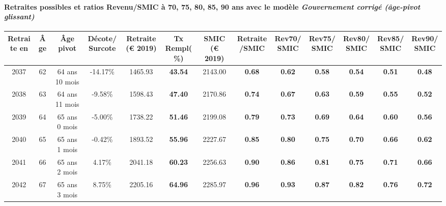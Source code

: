 \paragraph{Retraites possibles et ratios Revenu/SMIC à 70, 75, 80, 85, 90 ans avec le modèle \emph{Gouvernement corrigé (âge-pivot glissant)}}  
 
{ \scriptsize \begin{center} 
\begin{tabular}[htb]{|c|c||c|c||c|c||c||c|c|c|c|c|c|} 
\hline 
 Retraite en &  Âge &  Âge pivot &  Décote/Surcote &  Retraite (\euro{} 2019) &  Tx Rempl(\%) &  SMIC (\euro{} 2019) &  Retraite/SMIC &  Rev70/SMIC &  Rev75/SMIC &  Rev80/SMIC &  Rev85/SMIC &  Rev90/SMIC \\ 
\hline \hline 
 2037 &  62 &  64 ans 10 mois &  -14.17\% &  1465.93 &  {\bf 43.54} &  2143.00 &  {\bf {\color{red} 0.68}} &  {\bf {\color{red} 0.62}} &  {\bf {\color{red} 0.58}} &  {\bf {\color{red} 0.54}} &  {\bf {\color{red} 0.51}} &  {\bf {\color{red} 0.48}} \\ 
\hline 
 2038 &  63 &  64 ans 11 mois &  -9.58\% &  1598.43 &  {\bf 47.40} &  2170.86 &  {\bf {\color{red} 0.74}} &  {\bf {\color{red} 0.67}} &  {\bf {\color{red} 0.63}} &  {\bf {\color{red} 0.59}} &  {\bf {\color{red} 0.55}} &  {\bf {\color{red} 0.52}} \\ 
\hline 
 2039 &  64 &  65 ans 0 mois &  -5.00\% &  1738.22 &  {\bf 51.46} &  2199.08 &  {\bf {\color{red} 0.79}} &  {\bf {\color{red} 0.73}} &  {\bf {\color{red} 0.69}} &  {\bf {\color{red} 0.64}} &  {\bf {\color{red} 0.60}} &  {\bf {\color{red} 0.56}} \\ 
\hline 
 2040 &  65 &  65 ans 1 mois &  -0.42\% &  1893.52 &  {\bf 55.96} &  2227.67 &  {\bf {\color{red} 0.85}} &  {\bf {\color{red} 0.80}} &  {\bf {\color{red} 0.75}} &  {\bf {\color{red} 0.70}} &  {\bf {\color{red} 0.66}} &  {\bf {\color{red} 0.62}} \\ 
\hline 
 2041 &  66 &  65 ans 2 mois &  4.17\% &  2041.18 &  {\bf 60.23} &  2256.63 &  {\bf {\color{red} 0.90}} &  {\bf {\color{red} 0.86}} &  {\bf {\color{red} 0.81}} &  {\bf {\color{red} 0.75}} &  {\bf {\color{red} 0.71}} &  {\bf {\color{red} 0.66}} \\ 
\hline 
 2042 &  67 &  65 ans 3 mois &  8.75\% &  2205.16 &  {\bf 64.96} &  2285.97 &  {\bf {\color{red} 0.96}} &  {\bf {\color{red} 0.93}} &  {\bf {\color{red} 0.87}} &  {\bf {\color{red} 0.82}} &  {\bf {\color{red} 0.76}} &  {\bf {\color{red} 0.72}} \\ 
\hline 
\hline 
\end{tabular} 
\end{center} } 
